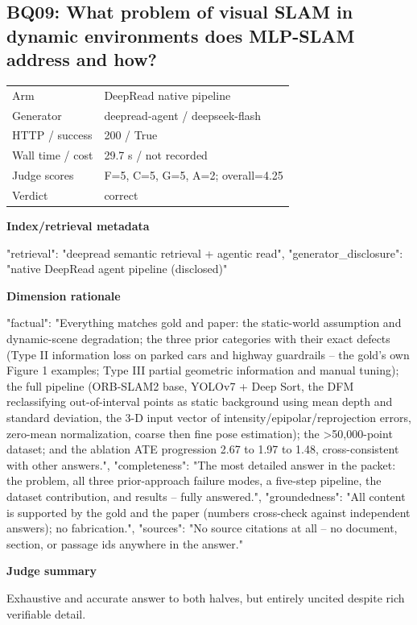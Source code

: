 \documentclass[10pt]{article}
\begin{document}
\subsection{BQ09: What problem of visual SLAM in dynamic environments does MLP-SLAM address and how?}
\begin{tabular}{@{}ll@{}}
Arm & DeepRead native pipeline\\
Generator & deepread-agent / deepseek-flash\\
HTTP / success & 200 / True\\
Wall time / cost & 29.7 s / not recorded\\
Judge scores & F=5, C=5, G=5, A=2; overall=4.25\\
Verdict & correct\\
\end{tabular}

\textbf{Index/retrieval metadata}
\begin{EvidenceText}
{
  "retrieval": "deepread semantic retrieval + agentic read",
  "generator_disclosure": "native DeepRead agent pipeline (disclosed)"
}
\end{EvidenceText}

\textbf{Dimension rationale}
\begin{EvidenceText}
{
  "factual": "Everything matches gold and paper: the static-world assumption and dynamic-scene degradation; the three prior categories with their exact defects (Type II information loss on parked cars and highway guardrails -- the gold's own Figure 1 examples; Type III partial geometric information and manual tuning); the full pipeline (ORB-SLAM2 base, YOLOv7 + Deep Sort, the DFM reclassifying out-of-interval points as static background using mean depth and standard deviation, the 3-D input vector of intensity/epipolar/reprojection errors, zero-mean normalization, coarse then fine pose estimation); the >50,000-point dataset; and the ablation ATE progression 2.67 to 1.97 to 1.48, cross-consistent with other answers.",
  "completeness": "The most detailed answer in the packet: the problem, all three prior-approach failure modes, a five-step pipeline, the dataset contribution, and results -- fully answered.",
  "groundedness": "All content is supported by the gold and the paper (numbers cross-check against independent answers); no fabrication.",
  "sources": "No source citations at all -- no document, section, or passage ids anywhere in the answer."
}
\end{EvidenceText}

\textbf{Judge summary}
\begin{EvidenceText}
Exhaustive and accurate answer to both halves, but entirely uncited despite rich verifiable detail.
\end{EvidenceText}
\end{document}
